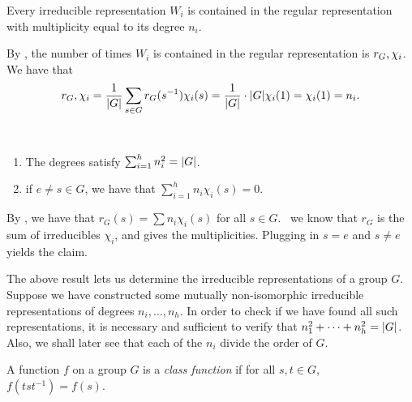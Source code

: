 \documentclass[letterpaper, 11pt, oneside]{book}
\begin{document}
\clearpage

\begin{cor}\label{cor:char_reg_rep_cor_1}
  Every irreducible representation $W_{i}$ is contained in the regular representation with multiplicity equal to its degree $n_{i}$.
\end{cor}
\begin{pf}
  By , the number of times $W_{i}$ is contained in the regular representation is $\inner{r_{G}, \chi_{i}}$.
  We have that
  \[
    \inner{r_{G}, \chi_{i}} = \frac{1}{\abs{G}} \sum_{s \in G} r_{G}(s^{-1}) \chi_{i}(s) = \frac{1}{\abs{G}} \cdot \abs{G} \chi_{i}(1) = \chi_{i}(1) = n_{i}.
  \]
\end{pf}

\begin{cor}\label{cor:char_reg_rep_cor_2}\
  \begin{enumerate}
  \item The degrees satisfy $\sum_{i = 1}^{h} n_{i}^{2} = \abs{G}$.
  \item if $e \neq s \in G$, we have that $\sum_{i = 1}^{h} n_{i} \chi_{i}(s) = 0$.
  \end{enumerate}
\end{cor}
\begin{pf}
  By , we have that $r_{G}(s) = \sum n_{i} \chi_{i}(s)$ for all $s \in G$.
  \Apriori\ we know that $r_{G}$ is the sum of irreducibles $\chi_{i}$, and  gives the multiplicities.
  Plugging in $s = e$ and $s \neq e$ yields the claim.
\end{pf}

The above result lets us determine the irreducible representations of a group $G$.
Suppose we have constructed some mutually non-isomorphic irreducible representations of degrees $n_{i}, \ldots, n_{h}$.
In order to check if we have found all such representations, it is necessary and sufficient to verify that $n_{1}^{2} + \cdots + n_{h}^{2} = \abs{G}$.
Also, we shall later see that each of the $n_{i}$ divide the order of $G$.

\begin{defn}
  A function $f$ on a group $G$ is a \emph{class function} if for all $s, t \in G$, $f(tst^{-1}) = f(s)$.
\end{defn}
\end{document}
